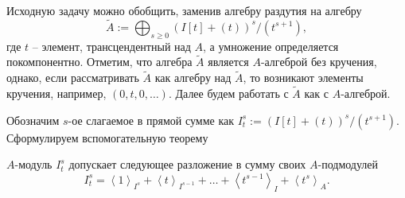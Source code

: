     Исходную задачу можно обобщить, заменив алгебру раздутия на алгебру
    \begin{equation*}
        \widetilde{A} := \bigoplus_{s \geq 0}{(I[t] + (t))^s / (t^{s + 1})},
    \end{equation*}
    где $t$ -- элемент, трансцендентный над $A$, а умножение определяется покомпонентно. 
    Отметим, что алгебра $\widetilde{A}$ является
    $A$-алгеброй без кручения, однако, если рассматривать $\widetilde{A}$ как алгебру над 
    $\widetilde{A}$, то возникают элементы кручения, например, $(0, t, 0, \dots)$. Далее будем 
    работать с $\widetilde{A}$ как с $A$-алгеброй.

    Обозначим $s$-ое слагаемое в прямой сумме как $I^s_t := (I[t] + (t))^s / (t^{s + 1})$.
    Сформулируем вспомогательную теорему
    \begin{Lemma}
        $A$-модуль $I^s_t$ допускает следующее разложение в сумму своих $A$-под\-мо\-ду\-лей
        \begin{equation} \label{sl}
            I^s_t = \left< 1  \right>_{I^s} + 
                    \left< t \right>_{I^{s-1}} + 
                    \dots +
                    \left< t^{s-1} \right>_{I} + 
                    \left< t^s \right>_A.
        \end{equation}
    \end{Lemma}
